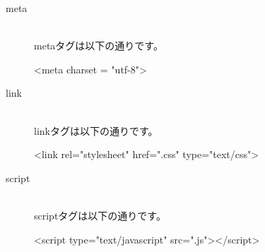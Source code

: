 \documentclass[a4j,titlepage]{jarticle}
\begin{document}
\begin{description}
\item [meta]~\\
metaタグは以下の通りです。

\begin{itemize}
<meta charset = "utf-8">
\end{itemize}


\item [link]~\\
linkタグは以下の通りです。

\begin{itemize}
<link rel="stylesheet" href=".css" type="text/css">
\end{itemize}


\item [script]~\\
scriptタグは以下の通りです。

\begin{itemize}
<script type="text/javascript" src=".js"></script>
\end{itemize}

\end{description}
\end{document}
